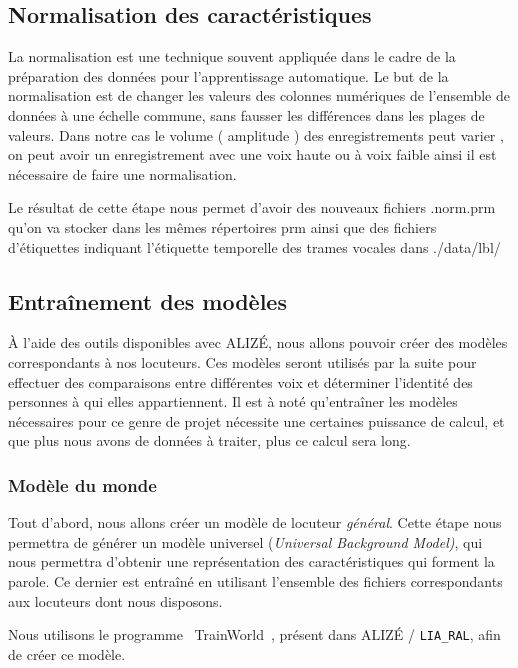 \documentclass[a4paper, 12pt]{book}
\newcounter{program}[subsection]
\begin{document}
\subsection{Normalisation des caractéristiques}

La normalisation est une technique souvent appliquée dans le cadre de la préparation des données pour l'apprentissage automatique. Le but de la normalisation est de changer les valeurs des colonnes numériques de l'ensemble de données à une échelle commune, sans fausser les différences dans les plages de valeurs. Dans notre cas le volume (  amplitude ) des enregistrements peut varier , on peut avoir un enregistrement avec une voix haute ou à voix faible ainsi il est nécessaire de faire une normalisation.

Le résultat de cette étape nous permet d'avoir des nouveaux fichiers .norm.prm qu’on va stocker dans les mêmes répertoires prm ainsi que des fichiers d'étiquettes indiquant l'étiquette temporelle des trames vocales dans ./data/lbl/

\subsection{Entraînement des modèles}

À l'aide des outils disponibles avec ALIZÉ, nous allons pouvoir créer des modèles correspondants à nos locuteurs. Ces modèles seront utilisés par la suite pour effectuer des comparaisons entre différentes voix et déterminer l'identité des personnes à qui elles appartiennent. Il est à noté qu'entraîner les modèles nécessaires pour ce genre de projet nécessite une certaines puissance de calcul, et que plus nous avons de données à traiter, plus ce calcul sera long.

\subsubsection{Modèle du monde}

Tout d'abord, nous allons créer un modèle de locuteur \textit{général}. Cette étape nous permettra de générer un modèle universel (\textit{Universal Background Model)}, qui nous permettra d'obtenir une représentation des caractéristiques qui forment la parole. Ce dernier est entraîné en utilisant l'ensemble des fichiers correspondants aux locuteurs dont nous disposons. 

Nous utilisons le programme \guillemotleft{}~TrainWorld~\guillemotright{}, présent dans ALIZÉ / \texttt{LIA\_RAL}, afin de créer ce modèle.
\end{document}
